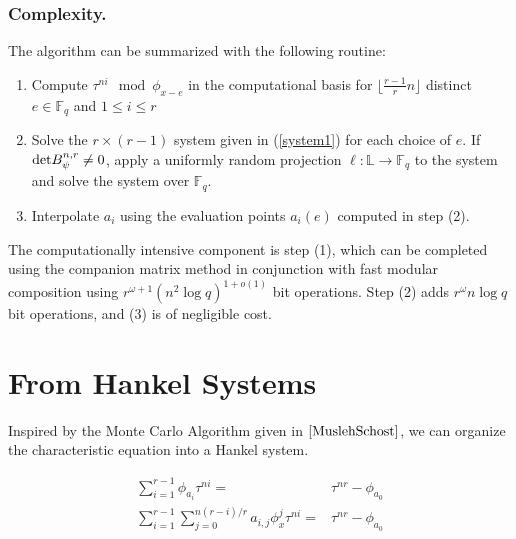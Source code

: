 \documentclass[sigconf]{acmart}
\newcommand{\F}{\mathbb{F}}
\renewcommand{\L}{\mathbb{L}}
\begin{document}
\subsubsection{Complexity.}

The algorithm can be summarized with the following routine:

\begin{enumerate}
    \item Compute $\tau^{ni} \mod \phi_{x-e}$ in the computational basis for $\lfloor\frac{r-1}{r}n \rfloor$ distinct $e \in \F_q$ and $1 \leq i \leq r$
    \item Solve the $r \times (r-1)$ system given in (\ref{system1}) for each choice of $e$. If $\textnormal{det} B_{\psi}^{n,r} \neq 0$, apply a uniformly random projection $\ell : \L \to \F_q$ to the system and solve the system over $\F_q$.
    \item Interpolate $a_i$ using the evaluation points $a_i(e)$ computed in step (2). 
\end{enumerate}

The computationally intensive component is step (1), which can be completed using the companion matrix method in conjunction with fast modular composition using $r^{\omega+1}(n^2 \log q)^{1 + o(1)}$ bit operations. Step (2) adds $r^{\omega}n\log q$ bit operations, and (3) is of negligible cost.

\section{From Hankel Systems}

Inspired by the Monte Carlo Algorithm given in $\cite{MuslehSchost}$, we can organize the characteristic equation into a Hankel system.

\begin{align*}
\sum_{i=1}^{r - 1} \phi_{a_i}\tau^{ni} = &  \tau^{nr} - \phi_{a_0}
\\
\sum_{i=1}^{r - 1} \sum_{j=0}^{n(r-i)/r}a_{i,j}\phi_{x}^j\tau^{ni} = & \tau^{nr} - \phi_{a_0}
\end{align*}
\end{document}
